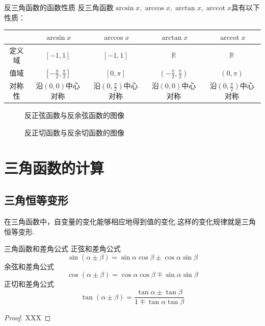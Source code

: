 \documentclass[lang=cn, zihao=5]{elegantbook}
\DeclareMathOperator{\arccot}{arccot}
\begin{document}
\begin{proposition}{反三角函数的函数性质}
    反三角函数$\arcsin{x},\arccos{x},\arctan{x},\arccot{x}$具有以下性质：

    \vspace{1em}
    \centering
    \renewcommand\arraystretch{1.2}
    \begin{tabular}{c|c|c|c|c}
        \hline
          & $\arcsin{x}$ & $\arccos{x}$ & $\arctan{x}$ & $\arccot{x}$ \\ \hline
        定义域 & $[-1,1]$ & $[-1,1]$ & $\mathbb{R}$ & $\mathbb{R}$ \\ \hline
        值域 & $[-\frac{\pi}{2} ,\frac{\pi}{2}]$ & $[0,\pi]$ & $(-\frac{\pi}{2},\frac{\pi}{2})$ & $(0,\pi)$ \\ \hline
        对称性 & 沿$(0,0)$中心对称 & 沿$(0,\frac{\pi}{2})$中心对称 & 沿$(0,0)$中心对称 & 沿$(0,\frac{\pi}{2})$中心对称 \\ \hline
    \end{tabular}
    
\end{proposition}

\begin{figure}[h!]
	\centering
	
	\caption{反正弦函数与反余弦函数的图像}
\end{figure}

\begin{figure}[h!]
	\centering
	
	\caption{反正切函数与反余切函数的图像}
\end{figure}

\section{三角函数的计算}

\subsection{三角恒等变形}

在三角函数中，自变量的变化能够相应地得到值的变化.这样的变化规律就是三角恒等变形.

\begin{theorem}{三角函数和差角公式} %
    正弦和差角公式$$\sin{(\alpha \pm \beta)}=\sin{\alpha}\cos{\beta} \pm \cos{\alpha}\sin{\beta}$$
    余弦和差角公式$$\cos{(\alpha \pm \beta)}=\cos{\alpha}\cos{\beta} \mp \sin{\alpha}\sin{\beta}$$
    正切和差角公式$$\tan{(\alpha \pm \beta)}=\frac{\tan{\alpha} \pm \tan{\beta}}{1 \mp \tan{\alpha}\tan{\beta}}$$
\end{theorem}
\begin{proof}
    XXX
\end{proof}
\end{document}
